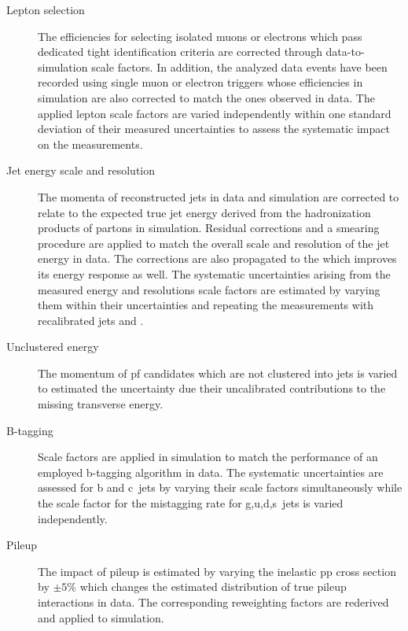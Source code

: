 \begin{description}
\item[Lepton selection] The efficiencies for selecting isolated muons or electrons which pass dedicated tight identification criteria are corrected through data-to-simulation scale factors. In addition, the analyzed data events have been recorded using single muon or electron triggers whose efficiencies in simulation are also corrected to match the ones observed in data. The applied lepton scale factors are varied independently within one standard deviation of their measured uncertainties to assess the systematic impact on the measurements.
\item[Jet energy scale and resolution] The momenta of reconstructed jets in data and simulation are corrected to relate to the expected true jet energy derived from the hadronization products of partons in simulation. Residual corrections and a smearing procedure are applied to match the overall scale and resolution of the jet energy in data. The corrections are also propagated to the \met which improves its energy response as well. The systematic uncertainties arising from the measured energy and resolutions scale factors are estimated by varying them within their uncertainties and repeating the measurements with recalibrated jets and \met.
\item[Unclustered energy] The momentum of \gls{pf} candidates which are not clustered into jets is varied to estimated the uncertainty due their uncalibrated contributions to the missing transverse energy.
\item[B-tagging] Scale factors are applied in simulation to match the performance of an employed b-tagging algorithm in data. The systematic uncertainties are assessed for b and c~jets by varying their scale factors simultaneously while the scale factor for the mistagging rate for g,u,d,s~jets is varied independently.
\item[Pileup] The impact of pileup is estimated by varying the inelastic \gls{pp} cross section by $\pm5\%$ which changes the estimated distribution of true pileup interactions in data. The corresponding reweighting factors are rederived and applied to simulation.
\end{description}

